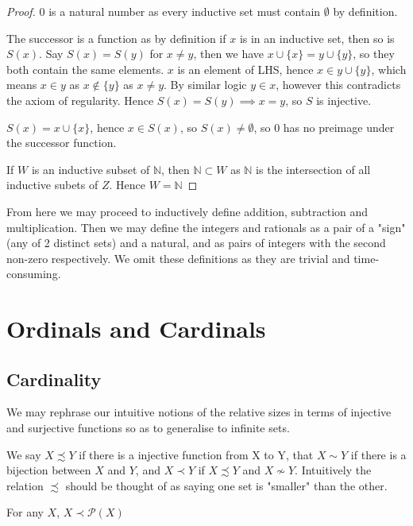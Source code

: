 \documentclass[]{article}
\begin{document}
	\begin{proof}
			$0$ is a natural number as every inductive set must contain $\emptyset$ by definition.

			The successor is a function as by definition if $x$ is in an inductive set, then so is $S(x)$. Say $S(x) = S(y)$ for $x \neq y$, then we have $x \cup \{x\} = y \cup \{y\}$, so they both contain the same elements.  $x$ is an element of LHS, hence $x \in y \cup \{y\}$, which means $x \in y$ as $x \not\in \{y\}$ as $x \neq y$. By similar logic $y \in x$, however this contradicts the axiom of regularity. Hence $S(x) = S(y) \implies x = y$, so $S$ is injective.

			$S(x) = x \cup \{x\}$, hence $x \in S(x)$, so $S(x) \neq \emptyset$, so $0$ has no preimage under the successor function.

			If $W$ is an inductive subset of $\mathbb{N}$, then $\mathbb{N} \subset W$ as $\mathbb{N}$ is the intersection of all inductive subets of $Z$. Hence $W = \mathbb{N}$	
	\end{proof}

	From here we may proceed to inductively define addition, subtraction and multiplication. Then we may define the integers and rationals as a pair of a "sign" (any of 2 distinct sets) and a natural, and as pairs of integers with the second non-zero respectively. We omit these definitions as they are trivial and time-consuming.

\section{Ordinals and Cardinals}

\subsection{Cardinality}

We may rephrase our intuitive notions of the relative sizes in terms of injective and surjective functions so as to generalise to infinite sets.

We say $X \precsim Y$ if there is a injective function from X to Y, that $X \sim Y$ if there is a bijection between $X$ and $Y$, and $X \prec Y$ if $X \precsim Y$ and $X \not\sim Y$. Intuitively the relation $\precsim$ should be thought of as saying one set is "smaller" than the other.

\begin{thm}  \label{thm:cantor}
		For any $X$, $X \prec \mathcal{P}(X)$	
\end{thm}
\end{document}
